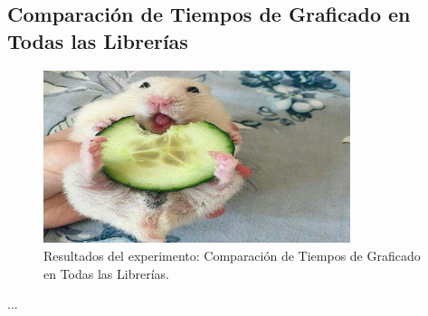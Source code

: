 \subsection{Comparación de Tiempos de Graficado en Todas las Librerías}
\label{exp:all-libs-time}

\begin{figure}[H]
    \centering
    \includegraphics[width=0.8\textwidth]{testing/images/all_libs_time.png}
    \caption{Resultados del experimento: Comparación de Tiempos de Graficado en Todas las Librerías.}
    \label{fig:all-libs-time}
\end{figure}

...
